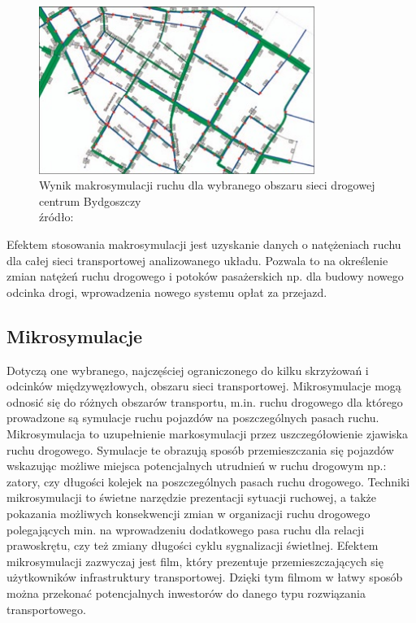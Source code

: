 \documentclass{sprawozdanie-agh}
\begin{document}
		\begin{figure}[H]
			\centering
			\captionsetup{justification=centering}
			\includegraphics[width=0.8\textwidth]{Makrosymulacja.jpg}
			\caption{Wynik makrosymulacji ruchu dla wybranego obszaru sieci drogowej centrum Bydgoszczy \\ źródło: \cite{makrosymulacja}}
			\label{fig:Makrosymulacja}
		\end{figure}
	
		Efektem stosowania makrosymulacji jest uzyskanie danych o natężeniach ruchu dla całej sieci transportowej analizowanego układu. Pozwala to na określenie zmian natężeń ruchu drogowego i potoków pasażerskich np. dla budowy nowego odcinka drogi, wprowadzenia nowego systemu opłat za przejazd.

		\subsection{Mikrosymulacje} 
		Dotyczą one wybranego, najczęściej ograniczonego do kilku skrzyżowań i odcinków międzywęzłowych, obszaru sieci transportowej. Mikrosymulacje mogą odnosić się do różnych obszarów transportu, m.in. ruchu drogowego dla którego prowadzone są symulacje ruchu pojazdów na poszczególnych pasach ruchu. Mikrosymulacja to uzupełnienie markosymulacji przez uszczegółowienie zjawiska ruchu drogowego. Symulacje te obrazują sposób przemieszczania się pojazdów wskazując możliwe miejsca potencjalnych utrudnień w ruchu drogowym np.: zatory, czy długości kolejek na poszczególnych pasach ruchu drogowego.
		Techniki mikrosymulacji to świetne narzędzie prezentacji sytuacji ruchowej, a także pokazania możliwych konsekwencji zmian w organizacji ruchu drogowego polegających min. na wprowadzeniu dodatkowego pasa ruchu dla relacji prawoskrętu, czy też zmiany długości cyklu sygnalizacji świetlnej. Efektem mikrosymulacji zazwyczaj jest film, który prezentuje przemieszczających się użytkowników infrastruktury transportowej. Dzięki tym filmom w łatwy sposób można przekonać potencjalnych inwestorów do danego typu rozwiązania transportowego.
\end{document}
